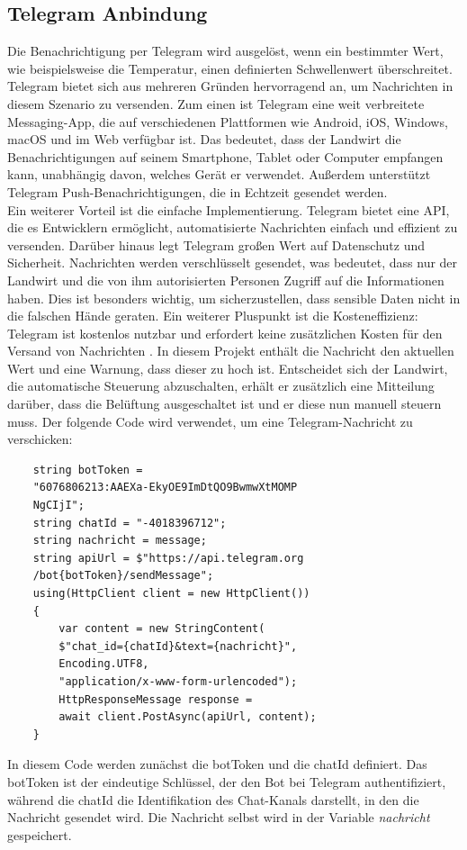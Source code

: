 \documentclass[conference]{IEEEtran}
\begin{document}
\subsection{Telegram Anbindung}
Die Benachrichtigung per Telegram wird ausgelöst, wenn ein bestimmter Wert, wie beispielsweise die Temperatur, einen definierten Schwellenwert überschreitet. Telegram bietet sich aus mehreren Gründen hervorragend an, um Nachrichten in diesem Szenario zu versenden. Zum einen ist Telegram eine weit verbreitete Messaging-App, die auf verschiedenen Plattformen wie Android, iOS, Windows, macOS und im Web verfügbar ist. Das bedeutet, dass der Landwirt die Benachrichtigungen auf seinem Smartphone, Tablet oder Computer empfangen kann, unabhängig davon, welches Gerät er verwendet. Außerdem unterstützt Telegram Push-Benachrichtigungen, die in Echtzeit gesendet werden. \\
Ein weiterer Vorteil ist die einfache Implementierung. Telegram bietet eine API,  die es Entwicklern ermöglicht, automatisierte Nachrichten einfach und effizient zu versenden. Darüber hinaus legt Telegram großen Wert auf Datenschutz und Sicherheit. Nachrichten werden verschlüsselt gesendet, was bedeutet, dass nur der Landwirt und die von ihm autorisierten Personen Zugriff auf die Informationen haben. Dies ist besonders wichtig, um sicherzustellen, dass sensible Daten nicht in die falschen Hände geraten. Ein weiterer Pluspunkt ist die Kosteneffizienz: Telegram ist kostenlos nutzbar und erfordert keine zusätzlichen Kosten für den Versand von Nachrichten \cite{telegram}.
In diesem Projekt enthält die Nachricht den aktuellen Wert und eine Warnung, dass dieser zu hoch ist. Entscheidet sich der Landwirt, die automatische Steuerung abzuschalten, erhält er zusätzlich eine Mitteilung darüber, dass die Belüftung ausgeschaltet ist und er diese nun manuell steuern muss.
Der folgende Code wird verwendet, um eine Telegram-Nachricht zu verschicken:
\begin{verbatim}
	string botToken = 
	"6076806213:AAEXa-EkyOE9ImDtQO9BwmwXtMOMP
	NgCIjI";
	string chatId = "-4018396712";
	string nachricht = message;
	string apiUrl = $"https://api.telegram.org
	/bot{botToken}/sendMessage";
	using(HttpClient client = new HttpClient())
	{
		var content = new StringContent(
		$"chat_id={chatId}&text={nachricht}", 
		Encoding.UTF8, 
		"application/x-www-form-urlencoded");
		HttpResponseMessage response = 
		await client.PostAsync(apiUrl, content);
	}
\end{verbatim}
In diesem Code werden zunächst die botToken und die chatId definiert. Das botToken ist der eindeutige Schlüssel, der den Bot bei Telegram authentifiziert, während die chatId die Identifikation des Chat-Kanals darstellt, in den die Nachricht gesendet wird. Die Nachricht selbst wird in der Variable \textit{nachricht} gespeichert. \\
\end{document}
